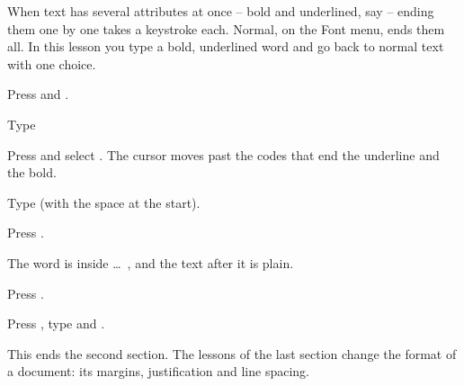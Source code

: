 When text has several attributes at once -- bold and underlined, say --
ending them one by one takes a keystroke each.  Normal, on the Font menu,
ends them all.  In this lesson you type a bold, underlined word and go back
to normal text with one choice.

\begin{WPSteps}
\item Press  and .
\item Type 
\item Press  and select .  The cursor
moves past the codes that end the underline and the bold.
\item Type  (with the
space at the start).
\end{WPSteps}

\begin{WPSteps}
\item Press .
\end{WPSteps}
The word is inside \Code{[BOLD][UND]} \ldots\ \Code{[und][bold]}, and the
text after it is plain.

\begin{WPSteps}
\item Press .
\item Press , type  and .
\end{WPSteps}
\EndReplay
This ends the second section.  The lessons of the last section change the
format of a document: its margins, justification and line spacing.
